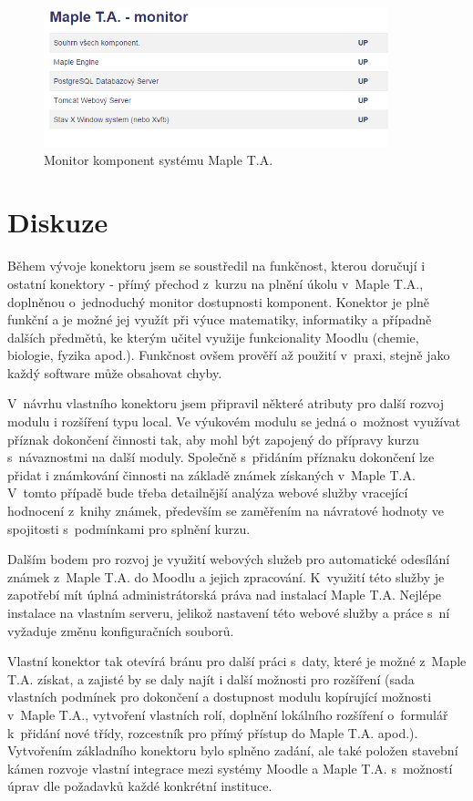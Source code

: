 \documentclass[
print,
  11pt,
  table,   
  nolof,    
  nolot,
  oneside,final
]{fithesis3}
\begin{document}
\begin{figure}[htb]
		  \begin{center}
		    \includegraphics[width=100mm]{images/monitor.png}
		   \end{center}
		  \caption{Monitor komponent systému Maple T.A.}
		  \label{fig:monitor}
		\end{figure}

\chapter{Diskuze}
Během vývoje konektoru jsem se soustředil na funkčnost, kterou doručují i ostatní konektory - přímý přechod z~kurzu na plnění úkolu v~Maple T.A., doplněnou o~jednoduchý monitor dostupnosti komponent. Konektor je plně funkční a je možné jej využít při výuce matematiky, informatiky a případně dalších předmětů, ke kterým učitel využije funkcionality Moodlu (chemie, biologie, fyzika apod.). Funkčnost ovšem prověří až použití v~praxi, stejně jako každý software může obsahovat chyby.

V~návrhu vlastního konektoru jsem připravil některé atributy pro další rozvoj modulu i rozšíření typu local. Ve výukovém modulu se jedná o~možnost využívat příznak dokončení činnosti tak, aby mohl být zapojený do přípravy kurzu s~návaznostmi na další moduly. Společně s~přidáním příznaku dokončení lze přidat i známkování činnosti na základě známek získaných v~Maple T.A. V~tomto případě bude třeba detailnější analýza webové služby vracející hodnocení z~knihy známek, především se zaměřením na návratové hodnoty ve spojitosti s~podmínkami pro splnění kurzu.

Dalším bodem pro rozvoj je využití webových služeb pro automatické odesílání známek z~Maple T.A. do Moodlu a jejich zpracování. K~využití této služby je zapotřebí mít úplná administrátorská práva nad instalací Maple T.A. Nejlépe instalace na vlastním serveru, jelikož nastavení této webové služby a práce s~ní vyžaduje změnu konfiguračních souborů.

Vlastní konektor tak otevírá bránu pro další práci s~daty, které je možné z~Maple T.A. získat, a zajisté by se daly najít i další možnosti pro rozšíření (sada vlastních podmínek pro dokončení a dostupnost modulu kopírující možnosti v~Maple T.A., vytvoření vlastních rolí, doplnění lokálního rozšíření o~formulář k~přidání nové třídy, rozcestník pro přímý přístup do Maple T.A. apod.). Vytvořením základního konektoru bylo splněno zadání, ale také položen stavební kámen rozvoje vlastní integrace mezi systémy Moodle a Maple T.A. s~možností úprav dle požadavků každé konkrétní instituce.
\end{document}

